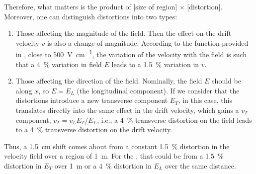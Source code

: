Therefore, what matters is the product of [size of region] $\times$ [distortion]. Moreover, one can distinguish distortions into two types:
\begin{enumerate}
\item Those affecting the magnitude of the field. Then the effect on the drift velocity $v$ is also a change of magnitude. According to the function provided in \cite{Walkowiak:2000wf}, close to \SI{500}{\V\per\cm}, the variation of the velocity with the field is such that a \SI{4}{\%} variation in field $E$ leads to a \SI{1.5}{\%} variation in $v$.
\item Those affecting the direction of the field. Nominally, the field $E$ should be along $x$, so $E = E_L$ (the longitudinal component). If we consider that the distortions introduce a new transverse component $E_T$, in this case, this translates directly into the same effect in the drift velocity, which gains a $v_T$ component, $v_T=v_L  E_T/E_L $, i.e., a \SI{4}{\%} transverse distortion on the field leads to a \SI{4}{\%} transverse distortion on the drift velocity.
\end{enumerate}

Thus, a \SI{1.5}{\cm} shift comes about from a constant \SI{1.5}{\%} distortion in the velocity field over a region of \SI{1}{\m}. For the \efield, that could be from a \SI{1.5}{\%} distortion in $E_T$ over \SI{1}{\m} or a \SI{4}{\%} distortion in $E_L$ over the same distance.

